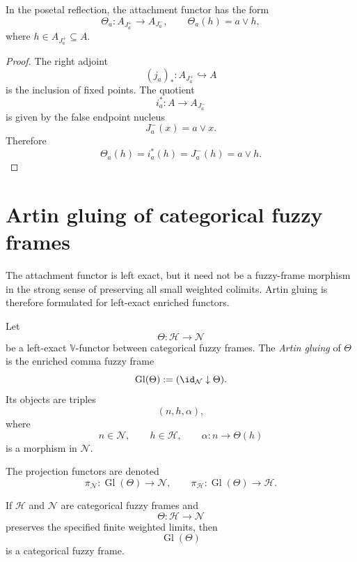 \begin{proposition}
\label{prop:attachment-posetal-general}
In the posetal reflection, the attachment functor has the form
\[
    \Theta_a:A_{J_a^+}\to A_{J_a^-},
    \qquad
    \Theta_a(h)=a\vee h,
\]
where \(h\in A_{J_a^+}\subseteq A\).
\end{proposition}

\begin{proof}
The right adjoint
\[
    (j_a)_\ast:A_{J_a^+}\hookrightarrow A
\]
is the inclusion of fixed points.  The quotient
\[
    i_a^\ast:A\to A_{J_a^-}
\]
is given by the false endpoint nucleus
\[
    J_a^-(x)=a\vee x.
\]
Therefore
\[
    \Theta_a(h)=i_a^\ast(h)=J_a^-(h)=a\vee h.
\]
\end{proof}

\section{Artin gluing of categorical fuzzy frames}
\label{sec:artin-gluing-categorical-fuzzy-frames-corrected}

The attachment functor is left exact, but it need not be a fuzzy-frame morphism
in the strong sense of preserving all small weighted colimits.  Artin gluing is
therefore formulated for left-exact enriched functors.

\begin{definition}
\label{def:enriched-artin-gluing}
Let
\[
    \Theta:\mathcal H\to\mathcal N
\]
be a left-exact \(\mathbb V\)-functor between categorical fuzzy frames.  The
\emph{Artin gluing} of \(\Theta\) is the enriched comma fuzzy frame
\[
    \operatorname{Gl}(\Theta)
    :=
    (\id_{\mathcal N}\downarrow\Theta).
\]
Its objects are triples
\[
    (n,h,\alpha),
\]
where
\[
    n\in\mathcal N,
    \qquad
    h\in\mathcal H,
    \qquad
    \alpha:n\to\Theta(h)
\]
is a morphism in \(\mathcal N\).
\end{definition}

The projection functors are denoted
\[
    \pi_{\mathcal N}:\operatorname{Gl}(\Theta)\to\mathcal N,
    \qquad
    \pi_{\mathcal H}:\operatorname{Gl}(\Theta)\to\mathcal H.
\]

\begin{proposition}
\label{prop:gluing-is-fuzzy-frame}
If \(\mathcal H\) and \(\mathcal N\) are categorical fuzzy frames and
\[
    \Theta:\mathcal H\to\mathcal N
\]
preserves the specified finite weighted limits, then
\[
    \operatorname{Gl}(\Theta)
\]
is a categorical fuzzy frame.
\end{proposition}

